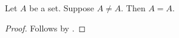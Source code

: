 \begin{proposition}\label{direct_contradictory_exact}
    Let $A$ be a set.
    Suppose $A\neq A$.
    Then $A=A$.
\end{proposition}
\begin{proof}
    Follows by \auto.
\end{proof}

